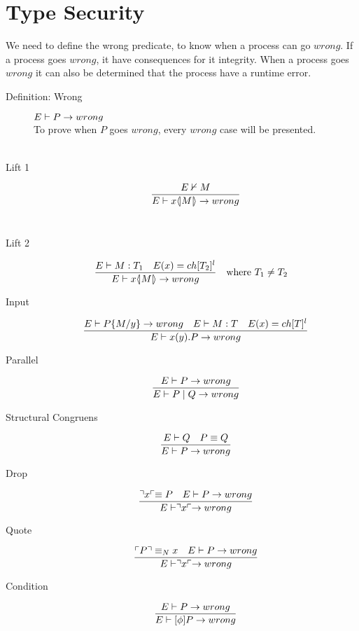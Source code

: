 \section{Type Security}

We need to define the wrong predicate, to know when a process can go $wrong$. If a process goes $wrong$, it have consequences for it integrity. When a process goes $wrong$ it can also be determined that the process have a runtime error.
\begin{description}
    \item[Definition: Wrong]
    $E \vdash P \rightarrow wrong$ \\
    
    To prove when $P$ goes $wrong$, every $wrong$ case will be presented.\\\\
    \item[Lift 1] \begin{align*}
        \frac{E \nvdash M}{E \vdash x \langle \! | M | \! \rangle \rightarrow wrong}
    \end{align*}\\
        
    \item[Lift 2] \begin{align*}
            \frac{E \vdash M:T_1 \quad E(x)=ch[T_2]^l}{E \vdash x \langle \! | M | \! \rangle \rightarrow wrong} &\quad \text{where}\ T_1 \neq T_2
    \end{align*}

    \item[Input] \begin{align*}
        \frac{E \vdash P\{ M/ y\} \rightarrow wrong \quad E \vdash M:T \quad E(x)= ch[T]^l} {E \vdash x(y).P \rightarrow wrong}\\
    \end{align*}

    \item[Parallel] \begin{align*}
        \frac{E \vdash P \rightarrow wrong}{E \vdash P \mid Q \rightarrow wrong}
    \end{align*}

    \item[Structural Congruens] \begin{align*}
        \frac{E \vdash Q \quad P \equiv Q}{E \vdash P \rightarrow wrong}
    \end{align*}

    \item[Drop]\begin{align*}
        \frac{\urcorner x \ulcorner \equiv P \quad E \vdash P \rightarrow wrong}{E \vdash \urcorner x \ulcorner \rightarrow wrong}
    \end{align*}

    \item[Quote]\begin{align*}
        \frac{\ulcorner P \urcorner \equiv _N x \quad E \vdash P \rightarrow wrong}{E \vdash \urcorner x \ulcorner \rightarrow wrong}
    \end{align*}

    \item[Condition]\begin{align*}
        \frac{E \vdash P \rightarrow wrong}{E \vdash [\phi]P \rightarrow wrong}
    \end{align*}
\end{description}
